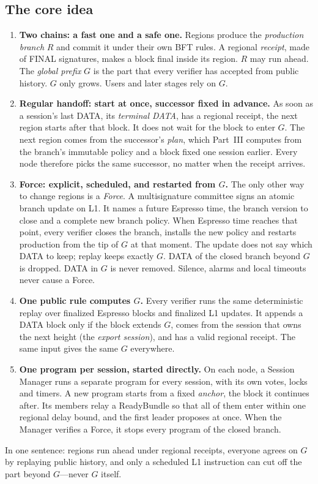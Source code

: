 \documentclass[11pt,a4paper]{article}
\newcommand{\defterm}[1]{\textcolor{rrBlue}{\textit{#1}}}
\begin{document}
\subsection{The core idea}
\label{sec:core-idea}
\begin{mdframed}[linewidth=.6pt,backgroundcolor=rrBlue!4,nobreak=true,
innertopmargin=6pt,innerbottommargin=6pt]
\begin{enumerate}[label=\textbf{\arabic*.},itemsep=4pt]
\item \textbf{Two chains: a fast one and a safe one.} Regions produce the
\defterm{production branch} $R$ and commit it under their own BFT rules.
A regional \emph{receipt}, made of FINAL signatures, makes a block final
inside its region. $R$ may run ahead. The \defterm{global prefix} $G$ is
the part that every verifier has accepted from public history. $G$ only
grows. Users and later stages rely on $G$.
\item \textbf{Regular handoff: start at once, successor fixed in
advance.} As soon as a session's last DATA, its \emph{terminal DATA}, has
a regional receipt, the next region starts after that block. It does not
wait for the block to enter $G$. The next region comes from the
successor's \emph{plan}, which Part~III computes from the branch's
immutable policy and a block fixed one session earlier. Every node
therefore picks the same successor, no matter when the receipt arrives.
\item \textbf{Force: explicit, scheduled, and restarted from $G$.} The
only other way to change regions is a \defterm{Force}. A multisignature
committee signs an atomic branch update on L1. It names a future Espresso
time, the branch version to close and a complete new branch policy. When
Espresso time reaches that point, every verifier closes the branch,
installs the new policy and restarts production from the tip of $G$ at that
moment. The update does not say which DATA to keep; replay keeps exactly
$G$. DATA of the closed branch beyond $G$ is dropped. DATA in $G$ is never
removed. Silence, alarms and local timeouts never cause a Force.
\item \textbf{One public rule computes $G$.} Every verifier runs the same
deterministic replay over finalized Espresso blocks and finalized L1
updates. It appends a DATA block only if the block extends $G$, comes
from the session that owns the next height (the \emph{export session}),
and has a valid regional receipt. The same input gives the same $G$
everywhere.
\item \textbf{One program per session, started directly.} On each node, a
Session Manager runs a separate program for every session, with its own
votes, locks and timers. A new program starts from a fixed
\emph{anchor}, the block it continues after. Its members relay a
ReadyBundle so that all of them enter within one regional delay bound,
and the first leader proposes at once. When the Manager verifies a
Force, it stops every program of the closed branch.
\end{enumerate}
\end{mdframed}
In one sentence: regions run ahead under regional receipts, everyone
agrees on $G$ by replaying public history, and only a scheduled L1
instruction can cut off the part beyond $G$---never $G$ itself.
\end{document}
